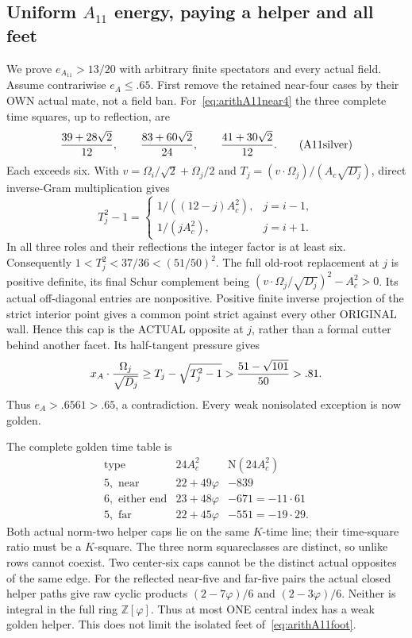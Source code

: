 \documentclass[11pt]{article}
\begin{document}
\subsection{Uniform \(A_{11}\) energy, paying a helper and all feet}
\label{app:arithA11uniform}

We prove \(e_{A_{11}}>13/20\) with arbitrary
finite spectators and every actual field.
Assume contrariwise \(e_A\le.65\).
First remove the retained near-four cases
by their OWN actual mate, not a field ban.
For~\eqref{eq:arithA11near4} the three complete
time squares, up to reflection, are
\[
 {39+28\sqrt2\over12},\qquad
 {83+60\sqrt2\over24},\qquad
 {41+30\sqrt2\over12}.
\tag{A11silver}\label{eq:arithA11silvertimes}
\]
Each exceeds six.
With \(v=\Omega_i/\sqrt2+\Omega_j/2\) and
\(T_j=(v\cdot\Omega_j)/(A_c\sqrt{D_j})\),
direct inverse-Gram multiplication gives
\[
 T_j^2-1=
 \begin{cases}
  1/((12-j)A_c^2),&j=i-1,\\
  1/(jA_c^2),&j=i+1 .
 \end{cases}
\]
In all three roles and their reflections the
integer factor is at least six.
Consequently \(1<T_j^2<37/36<(51/50)^2\).
The full old-root replacement at \(j\) is
positive definite, its final Schur complement
being \((v\cdot\Omega_j/\sqrt{D_j})^2-A_c^2>0\).
Its actual off-diagonal entries are nonpositive.
Positive finite inverse projection of the
strict interior point gives a common point
strict against every other ORIGINAL wall.
Hence this cap is the ACTUAL opposite at
\(j\), rather than a formal cutter behind
another facet.
Its half-tangent pressure gives
\[
 x_A\cdot{\Omega_j\over\sqrt{D_j}}
 \ge T_j-\sqrt{T_j^2-1}
 >{51-\sqrt{101}\over50}>.81 .
\]
Thus \(e_A>.6561>.65\), a contradiction.
Every weak nonisolated exception is now golden.

The complete golden time table is
\[
 \begin{array}{c|c|r}
 \text{type}&24A_c^2&\mathrm N(24A_c^2)\\ \hline
 5,\text{ near}&22+49\varphi&-839\\
 6,\text{ either end}&23+48\varphi&-671=-11\cdot61\\
 5,\text{ far}&22+45\varphi&-551=-19\cdot29 .
 \end{array}
\tag{A11gold}\label{eq:arithA11goldtimes}
\]
Both actual norm-two helper caps lie on the
same \(K\)-time line; their time-square ratio
must be a \(K\)-square.
The three norm squareclasses are distinct,
so unlike rows cannot coexist.
Two center-six caps cannot be the distinct
actual opposites of the same edge.
For the reflected near-five and far-five
pairs the actual closed helper paths give
raw cyclic products
\((2-7\varphi)/6\) and \((2-3\varphi)/6\).
Neither is integral in the full ring
\(\mathbb Z[\varphi]\).
Thus at most ONE central index has a weak
golden helper.  This does not limit the
isolated feet of~\eqref{eq:arithA11foot}.
\end{document}
